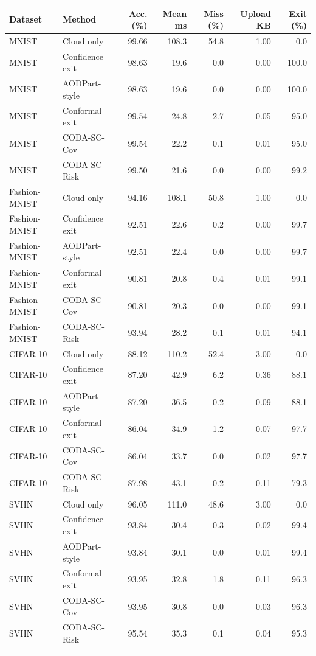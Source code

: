 \begin{tabular}{llrrrrr}
\toprule
Dataset & Method & Acc. (\%) & Mean ms & Miss (\%) & Upload KB & Exit (\%) \\
\midrule
MNIST & Cloud only & 99.66 & 108.3 & 54.8 & 1.00 & 0.0 \\
MNIST & Confidence exit & 98.63 & 19.6 & 0.0 & 0.00 & 100.0 \\
MNIST & AODPart-style & 98.63 & 19.6 & 0.0 & 0.00 & 100.0 \\
MNIST & Conformal exit & 99.54 & 24.8 & 2.7 & 0.05 & 95.0 \\
MNIST & CODA-SC-Cov & 99.54 & 22.2 & 0.1 & 0.01 & 95.0 \\
MNIST & CODA-SC-Risk & 99.50 & 21.6 & 0.0 & 0.00 & 99.2 \\
\addlinespace
Fashion-MNIST & Cloud only & 94.16 & 108.1 & 50.8 & 1.00 & 0.0 \\
Fashion-MNIST & Confidence exit & 92.51 & 22.6 & 0.2 & 0.00 & 99.7 \\
Fashion-MNIST & AODPart-style & 92.51 & 22.4 & 0.0 & 0.00 & 99.7 \\
Fashion-MNIST & Conformal exit & 90.81 & 20.8 & 0.4 & 0.01 & 99.1 \\
Fashion-MNIST & CODA-SC-Cov & 90.81 & 20.3 & 0.0 & 0.00 & 99.1 \\
Fashion-MNIST & CODA-SC-Risk & 93.94 & 28.2 & 0.1 & 0.01 & 94.1 \\
\addlinespace
CIFAR-10 & Cloud only & 88.12 & 110.2 & 52.4 & 3.00 & 0.0 \\
CIFAR-10 & Confidence exit & 87.20 & 42.9 & 6.2 & 0.36 & 88.1 \\
CIFAR-10 & AODPart-style & 87.20 & 36.5 & 0.2 & 0.09 & 88.1 \\
CIFAR-10 & Conformal exit & 86.04 & 34.9 & 1.2 & 0.07 & 97.7 \\
CIFAR-10 & CODA-SC-Cov & 86.04 & 33.7 & 0.0 & 0.02 & 97.7 \\
CIFAR-10 & CODA-SC-Risk & 87.98 & 43.1 & 0.2 & 0.11 & 79.3 \\
\addlinespace
SVHN & Cloud only & 96.05 & 111.0 & 48.6 & 3.00 & 0.0 \\
SVHN & Confidence exit & 93.84 & 30.4 & 0.3 & 0.02 & 99.4 \\
SVHN & AODPart-style & 93.84 & 30.1 & 0.0 & 0.01 & 99.4 \\
SVHN & Conformal exit & 93.95 & 32.8 & 1.8 & 0.11 & 96.3 \\
SVHN & CODA-SC-Cov & 93.95 & 30.8 & 0.0 & 0.03 & 96.3 \\
SVHN & CODA-SC-Risk & 95.54 & 35.3 & 0.1 & 0.04 & 95.3 \\
\addlinespace
\bottomrule
\end{tabular}
